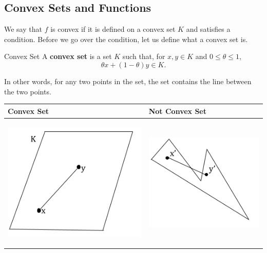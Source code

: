 \documentclass[letterpaper]{article}
\begin{document}
\subsection{Convex Sets and Functions}
We say that $f$ is convex if it is defined on a convex set $K$ and satisfies a condition. Before we go over the condition, let us define what a convex set is.
\begin{definition}{Convex Set}{}
    A \textbf{convex set} is a set $K$ such that, for $x, y \in K$ and $0 \leq \theta \leq 1$, 
    \[\theta x + (1 - \theta) y \in K.\]
\end{definition}
In other words, for any two points in the set, the set contains the line between the two points.
\begin{center}
    \begin{tabular}{p{3in}| p{3in}}
        \textbf{Convex Set} & \textbf{Not Convex Set} \\ 
        \hline 
        \begin{center}
            \includegraphics[scale=0.5]{../assets/convex_set.png}
        \end{center}
        & 
        \begin{center}
            \includegraphics[scale=0.5]{../assets/not_convex_set.png}
        \end{center}
    \end{tabular}
\end{center} 
\end{document}
